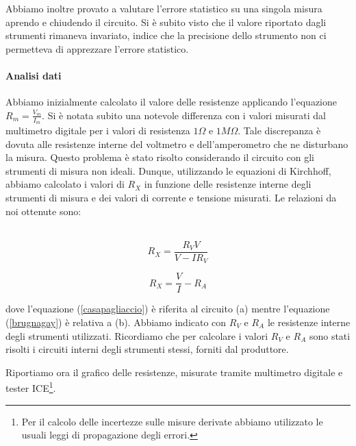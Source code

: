  Abbiamo inoltre provato a valutare l'errore statistico su una singola misura aprendo e chiudendo il circuito. Si è subito visto che il valore riportato dagli strumenti rimaneva invariato, indice che la precisione dello strumento non ci permetteva di apprezzare l'errore statistico.

\paragraph{Analisi dati\\}

Abbiamo inizialmente calcolato il valore delle resistenze applicando l'equazione $R_m=\frac{V_m}{I_m}$. Si è notata subito una notevole differenza con i valori misurati dal multimetro digitale per i valori di resistenza $1 \Omega$ e $1M \Omega$. Tale discrepanza è dovuta alle resistenze interne del voltmetro e dell'amperometro che ne disturbano la misura. Questo problema è stato risolto considerando il circuito con gli strumenti di misura non ideali. Dunque, utilizzando le equazioni di Kirchhoff, abbiamo calcolato i valori di $R_X$ in funzione delle resistenze interne degli strumenti di misura e dei valori di corrente e tensione misurati. Le relazioni da noi ottenute sono:\\
\\
\noindent\begin{minipage}{.5\linewidth}
\begin{equation}
R_X=\frac{R_VV}{V-IR_V}
\label{casapagliaccio}
\end{equation}
\end{minipage}%
\begin{minipage}{.5\linewidth}
\begin{equation}
R_X=\frac{V}{I}-R_A
\label{brugnagay}
\end{equation}
\end{minipage}
\break
dove l'equazione (\ref{casapagliaccio}) è riferita al circuito (a) mentre l'equazione (\ref{brugnagay}) è relativa a (b). Abbiamo indicato con $R_V$ e $R_A$ le resistenze interne degli strumenti utilizzati. 
Ricordiamo che per calcolare i valori $R_V$ e $R_A$ sono stati risolti i circuiti interni degli strumenti stessi, forniti dal produttore. 

Riportiamo ora il grafico delle resistenze, misurate tramite multimetro digitale e tester ICE\footnote{Per il calcolo delle incertezze sulle misure derivate abbiamo utilizzato le usuali leggi di propagazione degli errori.}. 

